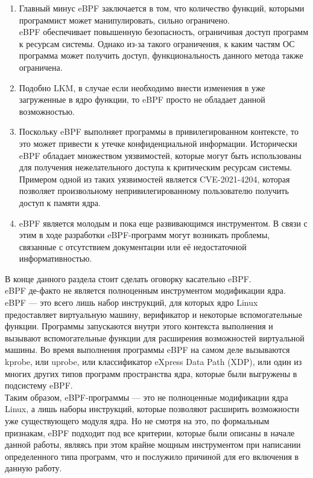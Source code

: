 \begin{enumerate}
    \item Главный минус eBPF заключается в том, что количество функций, которыми программист может манипулировать, сильно ограничено.\\
    eBPF обеспечивает повышенную безопасность, ограничивая доступ программ к ресурсам системы.
    Однако из-за такого ограничения, к каким частям ОС программа может получить доступ, функциональность данного метода также ограничена.
    \item Подобно LKM, в случае если необходимо внести изменения в уже загруженные в ядро функции, то eBPF просто не обладает данной возможностью.
    \item Поскольку eBPF выполняет программы в привилегированном контексте, то это может привести к утечке конфиденциальной информации.
    Исторически eBPF обладает множеством уязвимостей, которые могут быть использованы для получения нежелательного доступа к критическим ресурсам системы.
    Примером одной из таких уязвимостей является CVE-2021-4204\cite{cve-2021-4204}, которая позволяет произвольному непривилегированному пользователю получить доступ к памяти ядра.
    \item eBPF является молодым и пока еще развивающимся инструментом.
    В связи с этим в ходе разработки eBPF-программ могут возникать проблемы, связанные с отсутствием документации или её недостаточной информативностью.
\end{enumerate}
\newpage
\noindent В конце данного раздела стоит сделать оговорку касательно eBPF\@.
\vspace{5mm}\\
eBPF де-факто не является полноценным инструментом модификации ядра.\\
eBPF — это всего лишь набор инструкций, для которых ядро Linux предоставляет виртуальную машину, верификатор и некоторые вспомогательные функции.
Программы запускаются внутри этого контекста выполнения и вызывают вспомогательные функции для расширения возможностей виртуальной машины.
Во время выполнения программы eBPF на самом деле вызываются kprobe, или uprobe, или классификатор eXpress Data Path (XDP),
или один из многих других типов программ пространства ядра, которые были выгружены в подсистему eBPF\@.
\\
Таким образом, eBPF-программы — это не полноценные модификации ядра Linux, а лишь наборы инструкций, которые позволяют расширить возможности уже существующего модуля ядра\@.
Но не смотря на это, по формальным признакам, eBPF подходит под все критерии, которые были описаны в начале данной работы,
являясь при этом крайне мощным инструментом при написании определенного типа программ, что и послужило причиной для его включения в данную работу.
\newpage


